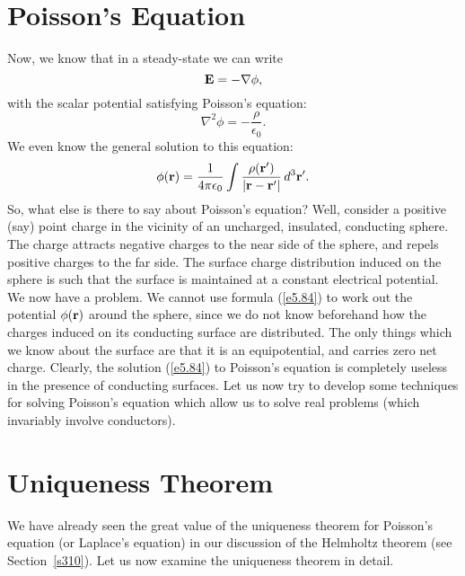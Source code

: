 \section{Poisson's Equation}
Now, we know that in a steady-state we can write
\begin{equation}
{\bf E} = -\nabla\phi,
\end{equation}
with the scalar potential satisfying Poisson's equation:
\begin{equation}
\nabla^2 \phi = - \frac{\rho}{\epsilon_0}.
\end{equation}
We even know the general solution to this equation:
\begin{equation}\label{e5.84}
\phi({\bf r}) = \frac{1}{4\pi\epsilon_0} \int \frac{\rho({\bf r}')}
{|{\bf r} - {\bf r'}|}\,d^3{\bf r}'.
\end{equation}
So, what else is there to say about Poisson's equation? Well, consider a 
positive (say) point
charge in  the vicinity of an uncharged, insulated, conducting sphere. The charge
attracts negative charges to the near side of the sphere, and repels positive
charges to the far side. The surface charge distribution induced on the
sphere is such that the surface is maintained at a constant electrical potential.
We now have a problem. We cannot use formula (\ref{e5.84}) to work out the
potential $\phi({\bf r})$ around the sphere, since we do not know beforehand how the
 charges induced on its  conducting surface  are distributed. The only things
which  we know about the surface   are that it is an equipotential,
and carries zero net charge.  Clearly, the
solution (\ref{e5.84})  to Poisson's equation is completely useless in the presence of conducting surfaces. Let us now try to
develop some techniques for solving Poisson's equation which allow us to solve
real problems (which invariably involve conductors). 
 
\section{Uniqueness Theorem}\label{suniq}
We have already seen the great value of the uniqueness theorem for Poisson's
equation (or Laplace's equation) in our discussion of the Helmholtz theorem (see
Section~\ref{s310}). Let us now examine the uniqueness theorem in  detail.


